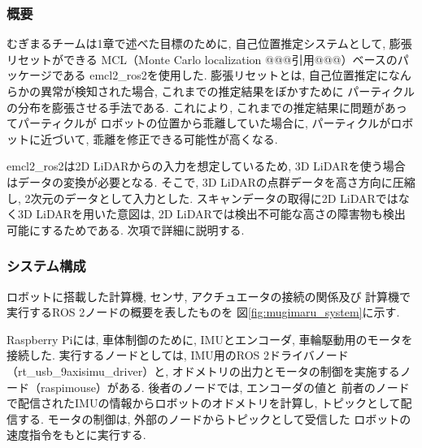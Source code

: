 \subsubsection{概要}
むぎまるチームは1章で述べた目標のために, 
自己位置推定システムとして, 
膨張リセット\cite{ueda2004iros}ができる
MCL（Monte Carlo localization @@@引用@@@）ベースのパッケージである
emcl2\_ros2\cite{emcl2_ros2}を使用した. 
膨張リセットとは, 
自己位置推定になんらかの異常が検知された場合, 
これまでの推定結果をぼかすために
パーティクルの分布を膨張させる手法である. 
これにより, これまでの推定結果に問題があってパーティクルが
ロボットの位置から乖離していた場合に, 
パーティクルがロボットに近づいて, 
乖離を修正できる可能性が高くなる. 


emcl2\_ros2は2D LiDARからの入力を想定しているため, 
3D LiDARを使う場合はデータの変換が必要となる. 
そこで, 3D LiDARの点群データを高さ方向に圧縮し, 
2次元のデータとして入力とした. 
スキャンデータの取得に2D LiDARではなく3D LiDARを用いた意図は, 
2D LiDARでは検出不可能な高さの障害物も検出可能にするためである. 
次項で詳細に説明する. 

\subsubsection{システム構成}
ロボットに搭載した計算機, センサ, アクチュエータの接続の関係及び
計算機で実行するROS 2ノードの概要を表したものを
図\ref{fig:mugimaru_system}に示す. 

Raspberry Piには, 車体制御のために, IMUとエンコーダ, 車輪駆動用のモータを接続した. 
実行するノードとしては, IMU用のROS 2ドライバノード（rt\_usb\_9axisimu\_driver）と, 
オドメトリの出力とモータの制御を実施するノード（raspimouse）がある. 
後者のノードでは, エンコーダの値と
前者のノードで配信されたIMUの情報からロボットのオドメトリを計算し, 
トピックとして配信する. 
モータの制御は, 外部のノードからトピックとして受信した
ロボットの速度指令をもとに実行する. 

